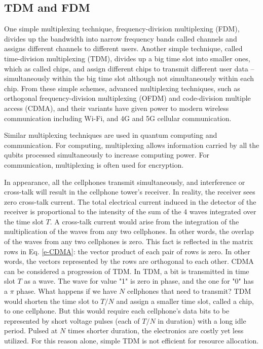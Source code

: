 \documentclass[oneside, letter, 12pt]{book}
\begin{document}
\subsection{TDM and FDM}
One simple multiplexing technique, frequency-division multiplexing (FDM), divides up the bandwidth into narrow frequency bands called channels and assigns different channels to different users. Another simple technique, called time-division multiplexing (TDM), divides up a big time slot into smaller ones, which as called chips, and assign different chips to transmit different user data -- simultaneously within the big time slot although not simultaneously within each chip. From these simple schemes, advanced multiplexing techniques, such as orthogonal frequency-division multiplexing (OFDM) and code-division multiple access (CDMA), and their variants have given power to modern wireless communication including Wi-Fi, and 4G and 5G cellular communication.

Similar multiplexing techniques are used in quantum computing and communication. For computing, multiplexing allows information carried by all the qubits processed simultaneously to increase computing power. For communication, multiplexing is often used for encryption.

In appearance, all the cellphones transmit simultaneously, and interference or cross-talk will result in the cellphone tower's receiver. In reality, the receiver sees zero cross-talk current. The total electrical current induced in the detector of the receiver is proportional to the intensity of the sum of the 4 waves integrated over the time slot $T$. A cross-talk current would arise from the integration of the multiplication of the waves from any two cellphones. In other words, the overlap of the waves from any two cellphones is zero. This fact is reflected in the matrix rows in Eq. \ref{e-CDMA}: the vector product of each pair of rows is zero. In other words, the vectors represented by the rows are orthogonal to each other. 
CDMA can be considered a progression of TDM. In TDM, a bit is transmitted in time slot $T$ as a wave. The wave for value "1" is zero in phase, and the one for "0" has a $\pi$ phase. What happens if we have $N$ cellphones that need to transmit? TDM would shorten the time slot to $T/N$ and assign a smaller time slot, called a chip, to one cellphone. But this would require each cellphone's data bits to be represented by short voltage pulses (each of $T/N$ in duration) with a long idle period. Pulsed at $N$ times shorter duration, the electronics are costly yet less utilized. For this reason alone, simple TDM is not efficient for resource allocation.
\end{document}
